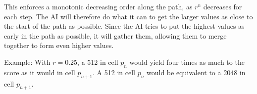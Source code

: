 \documentclass{article}
\begin{document}
This enforces a monotonic decreasing order along the path, as $r^n$ decreases for each step. The AI will therefore do what it can to get the larger values as close to the start of the path as possible. Since the AI tries to put the highest values as early in the path as possible, it will gather them, allowing them to merge together to form even higher values.

Example: With $r=0.25$, a 512 in cell $p_n$ would yield four times as much to the score as it would in cell $p_{n+1}$. A 512 in cell $p_n$ would be equivalent to a 2048 in cell $p_{n+1}$.

\end{document}
